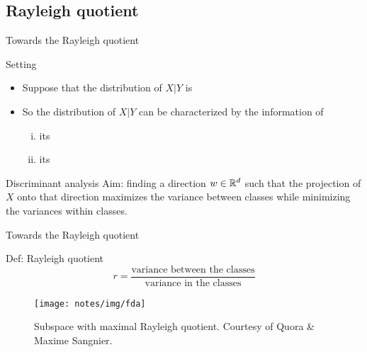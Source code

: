 \documentclass[xcolor={usenames,dvipsnames},handout]{beamer}
\begin{document}
\subsection{Rayleigh quotient}
	\begin{frame}{Towards the Rayleigh quotient}
	
	\begin{block}{Setting}
	\begin{itemize}
	\item Suppose that the distribution of $X|Y$ is 
	\pause
	\item So the  distribution of $X|Y$ can be characterized by the information of
	\begin{enumerate}[(i)]
	\item  its 
	\item  its 
	\end{enumerate}
	\end{itemize}
	\end{block}
	
	\pause
	
	\begin{block}{Discriminant analysis}
	 Aim: finding a direction $w\in\mathbb{R}^d$ such that the projection of $X$ onto that direction maximizes the variance between classes while minimizing the variances within classes.
	 \end{block}
	 
	\end{frame}

	\begin{frame}{Towards the Rayleigh quotient}
	
	\begin{block}{Def: Rayleigh quotient}
		$$
			r = \frac{\text{variance between the classes}}{\text{variance in the classes}}
		$$
	\end{block}
	\begin{figure}[ht]
		\center
		\texttt{[image: notes/img/fda]}
		\caption{Subspace with maximal Rayleigh quotient.
		Courtesy of Quora \& Maxime Sangnier.}
		\label{fig:fda}
	\end{figure}
	\end{frame}
\end{document}
